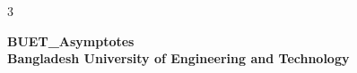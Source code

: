 \documentclass[9pt, a4paper, notitlepage]{extreport}
\begin{document}
	\begin{multicols*}{3}
	\flushcolumns
	\thispagestyle{plain}
	\begin{center}
		{\bfseries\fontsize{22}{26}\selectfont BUET\_Asymptotes\\[0.35em]}
		{\bfseries\fontsize{12}{15}\selectfont Bangladesh University of Engineering and Technology\\[0.75em]}
	\end{center}
	\setcounter{tocdepth}{0}
	\tableofcontents

	\end{multicols*}

\end{document}
